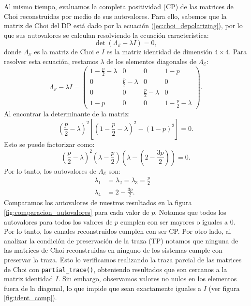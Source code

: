 \documentclass[letterpaper,12pt]{thesisECFM}
\theoremstyle{plain}
\theoremstyle{definition}
\theoremstyle{definition}
\theoremstyle{remark}
\newcommand{\1}{\mathbb{1}}
\begin{document}
Al mismo tiempo, evaluamos la completa positividad (CP) de las matrices de Choi reconstruidas por medio de sus autovalores. Para ello, sabemos que la matriz de Choi del DP está dado por la ecuación (\ref{ec:choi_depolarizing}), por lo que sus autovalores se calculan resolviendo la ecuación característica:
\begin{equation}
\det(\Lambda_\mathcal{E} - \lambda I) = 0,
\end{equation}
donde $\Lambda_\mathcal{E}$ es la matriz de Choi e $I$ es la matriz identidad
de dimensión $4 \times 4$. Para resolver esta ecuación, restamos $\lambda$ de
los elementos diagonales de $\Lambda_\mathcal{E}$:
\begin{equation}
\Lambda_\mathcal{E} - \lambda I = \begin{pmatrix}
1 - \frac{p}{2} - \lambda & 0 & 0 & 1 - p \\
0 & \frac{p}{2} - \lambda & 0 & 0 \\
0 & 0 & \frac{p}{2} - \lambda & 0 \\
1 - p & 0 & 0 & 1 - \frac{p}{2} - \lambda
\end{pmatrix}.
\end{equation}
Al encontrar la determinante de la matriz:
\begin{equation}
\left(\frac{p}{2} - \lambda \right)^2  \left[ \left(1 - \frac{p}{2} - \lambda \right)^2 - (1 - p)^2 \right] = 0.
\end{equation}
Esto se puede factorizar como:
\begin{equation}
\left(\frac{p}{2} - \lambda \right)^2 \left(\lambda - \frac{p}{2} \right) \left(\lambda - \left(2 - \frac{3p}{2} \right) \right) = 0.
\end{equation}
Por lo tanto, los autovalores de $\Lambda_{\mathcal{E}}$ son:
\begin{align}
\lambda_1 &=\lambda_2=\lambda_3 = \frac{p}{2} \quad \\
\lambda_4 &= 2 - \frac{3p}{2}.
\end{align}
Comparamos los autovalores de nuestros resultados en la figura
\ref{fig:comparacion_autovalores} para cada valor de $p$. Notamos que todos los
autovalores para todos los valores de $p$ cumplen con ser mayores o iguales a
0. Por lo tanto, los canales reconstruidos cumplen con ser CP.  Por otro
lado, al analizar la condición de preservación de la traza (TP) notamos que
ninguna de las matrices de Choi reconstruidas en ninguno de los sistemas cumple
con preservar la traza. Esto lo verificamos realizando la traza parcial de las matrices de Choi con \texttt{partial\_trace()}, obteniendo resultados que son cercanos a la matriz identidad $I$. Sin embargo, observamos valores no nulos en los elementos fuera de la diagonal, lo que impide que sean exactamente iguales a $I$ (ver figura \ref{fig:ident_comp}).
\end{document}
